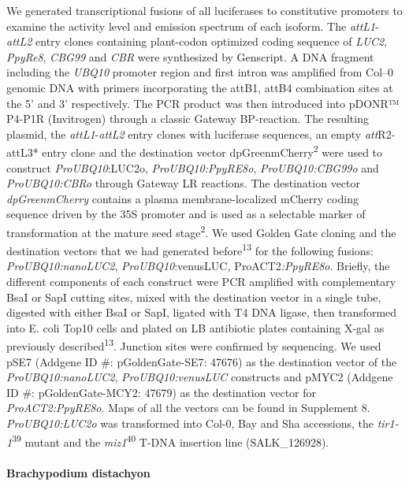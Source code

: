 \documentclass[]{article}
\begin{document}
We generated transcriptional fusions of all luciferases to constitutive
promoters to examine the activity level and emission spectrum of each
isoform. The \emph{attL1}-\emph{attL2} entry clones containing
plant-codon optimized coding sequence of \emph{LUC2}, \emph{PpyRe8},
\emph{CBG99} and \emph{CBR} were synthesized by Genscript. A DNA
fragment including the \emph{UBQ10} promoter region and first intron was
amplified from Col--0 genomic DNA with primers incorporating the attB1,
attB4 combination sites at the 5' and 3' respectively. The PCR product
was then introduced into pDONR™ P4-P1R (Invitrogen) through a classic
Gateway BP-reaction. The resulting plasmid, the
\emph{attL1}-\emph{attL2} entry clones with luciferase sequences, an
empty \emph{att}R2-attL3* entry clone and the destination vector
dpGreenmCherry\textsuperscript{2} were used to construct
\emph{ProUBQ10}:LUC2o, \emph{ProUBQ10:PpyRE8o}, \emph{ProUBQ10:CBG99o}
and \emph{ProUBQ10:CBRo} through Gateway LR reactions. The destination
vector \emph{dpGreenmCherry} contains a plasma membrane-localized
mCherry coding sequence driven by the 35S promoter and is used as a
selectable marker of transformation at the mature seed
stage\textsuperscript{2}. We used Golden Gate cloning and the
destination vectors that we had generated before\textsuperscript{13} for
the following fusions: \emph{ProUBQ10:nanoLUC2},
\emph{ProUBQ10}:venusLUC\emph{, }ProACT2\emph{:PpyRE8o}. Briefly, the
different components of each construct were PCR amplified with
complementary BsaI or SapI cutting sites, mixed with the destination
vector in a single tube, digested with either BsaI or SapI, ligated with
T4 DNA ligase, then transformed into E. coli Top10 cells and plated on
LB antibiotic plates containing X-gal as previously
described\textsuperscript{13}. Junction sites were confirmed by
sequencing. We used pSE7 (Addgene ID \#: pGoldenGate-SE7: 47676) as the
destination vector of the \emph{ProUBQ10:nanoLUC2},
\emph{ProUBQ10:venusLUC} constructs and pMYC2 (Addgene ID \#:
pGoldenGate-MCY2: 47679) as the destination vector for
\emph{ProACT2:PpyRE8o}. Maps of all the vectors can be found in
Supplement 8. \emph{ProUBQ10:LUC2o} was transformed into Col-0, Bay and
Sha accessions, the \emph{tir1-1}\textsuperscript{39} mutant and the
\emph{miz1}\textsuperscript{40} T-DNA insertion line (SALK\_126928).

\paragraph{Brachypodium distachyon}\label{brachypodium-distachyon}
\end{document}
